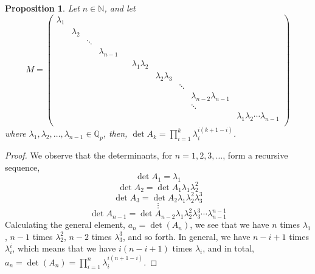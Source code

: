 \documentclass[12pt]{article}
\newtheorem{proposition}[theorem]{Proposition}
\begin{document}
\begin{proposition}
\label{prop.h.matrix.determinant}
Let $n\in\mathbb{N}$, and let $$
M=\begin{pmatrix}
\lambda_1 & & & & & & & & &\\
& \lambda_2 & & & & & & & &\\
& & \ddots & & & & & & &\\
& & & \lambda_{n-1} & & & & & &\\
& & & & & \lambda_1\lambda_2 & & & &\\
& & & & & & \lambda_2\lambda_3 & & &\\
& & & & & & & \ddots & &\\
& & & & & & & & \lambda_{n-2}\lambda_{n-1} &\\
& & & & & & & & \ddots &\\
& & & & & & & & & \lambda_1\lambda_2\cdots\lambda_{n-1}\\
\end{pmatrix}
$$
where $\lambda_1,\lambda_2,\dots,\lambda_{n-1}\in\mathbb{Q}_p$, then, $\det A_k=\prod_{i=1}^{k}\lambda_i^{i(k+1-i)}$.
\end{proposition}
\begin{proof}
We observe that the determinants, for $n=1,2,3,\dots$, form a recursive sequence, $$
\det A_1=\lambda_1$$
$$\det A_2=\det A_1\lambda_1\lambda_2^2$$
$$\det A_3=\det A_2\lambda_1\lambda_2^2\lambda_3^3$$
$$\vdots$$
$$\det A_{n-1}=\det A_{n-2}\lambda_1\lambda_2^2\lambda_3^3\cdots\lambda_{n-1}^{n-1}$$
Calculating the general element, $a_n=\det(A_n)$, we see that we have $n$ times $\lambda_1$, $n-1$ times $\lambda_2^2$, $n-2$ times $\lambda_3^3$, and so forth. In general, we have $n-i+1$ times $\lambda_i^i$, which means that we have $i(n-i+1)$ times $\lambda_i$, and in total, $a_n=\det(A_n)=\prod_{i=1}^n\lambda_i^{i(n+1-i)}$.
\end{proof}
\end{document}
